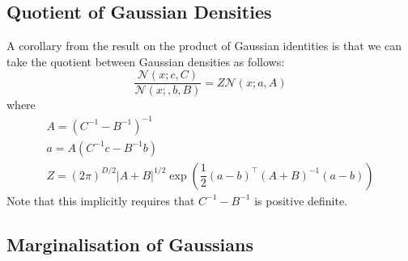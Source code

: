 \documentclass[11pt]{report} %
\begin{document}
\subsection{Quotient of Gaussian Densities}

A corollary from the result on the product of Gaussian identities is that we can take the quotient between Gaussian densities as follows:
\begin{equation}
\dfrac{\mathcal{N}\left(x; c, C\right)}{\mathcal{N}\left(x;, b, B\right)} = Z\mathcal{N}\left(x; a, A\right)
\end{equation}
where
\begin{gather}
A = \left(C^{-1} - B^{-1}\right)^{-1} \\
a = A\left(C^{-1}c - B^{-1}b\right) \\
Z = \left(2\pi\right)^{D/2}\left|A+B\right|^{1/2}\exp\left(\dfrac{1}{2}\left(a-b\right)^{\top}\left(A+B\right)^{-1}\left(a-b\right)\right)
\end{gather}
Note that this implicitly requires that $C^{-1} - B^{-1}$ is positive definite.

\subsection{Marginalisation of Gaussians}
\end{document}
